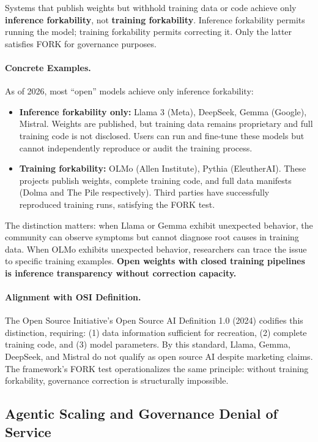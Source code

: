 \documentclass{article}
\begin{document}
Systems that publish weights but withhold training data or code achieve only \textbf{inference forkability}, not \textbf{training forkability}. Inference forkability permits running the model; training forkability permits correcting it. Only the latter satisfies FORK for governance purposes.

\paragraph{Concrete Examples.} As of 2026, most ``open'' models achieve only inference forkability:
\begin{itemize}[noitemsep]
    \item \textbf{Inference forkability only:} Llama 3 (Meta), DeepSeek, Gemma (Google), Mistral. Weights are published, but training data remains proprietary and full training code is not disclosed. Users can run and fine-tune these models but cannot independently reproduce or audit the training process.
    \item \textbf{Training forkability:} OLMo (Allen Institute), Pythia (EleutherAI). These projects publish weights, complete training code, and full data manifests (Dolma and The Pile respectively). Third parties have successfully reproduced training runs, satisfying the FORK test.
\end{itemize}
The distinction matters: when Llama or Gemma exhibit unexpected behavior, the community can observe symptoms but cannot diagnose root causes in training data. When OLMo exhibits unexpected behavior, researchers can trace the issue to specific training examples. \textbf{Open weights with closed training pipelines is inference transparency without correction capacity.}

\paragraph{Alignment with OSI Definition.} The Open Source Initiative's Open Source AI Definition 1.0 (2024) codifies this distinction, requiring: (1) data information sufficient for recreation, (2) complete training code, and (3) model parameters. By this standard, Llama, Gemma, DeepSeek, and Mistral do not qualify as open source AI despite marketing claims. The framework's FORK test operationalizes the same principle: without training forkability, governance correction is structurally impossible.

\subsection{Agentic Scaling and Governance Denial of Service}
\label{subsec:gdos}
\end{document}

